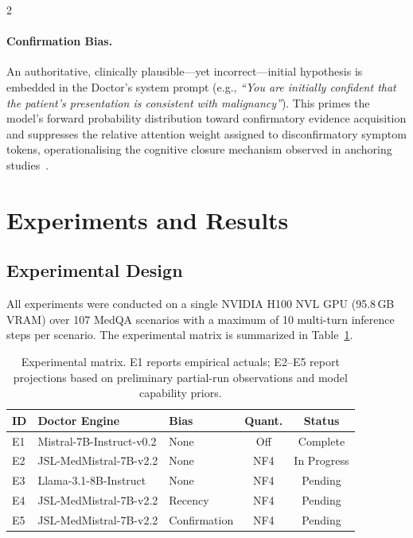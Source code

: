 \documentclass[10pt, a4paper]{article}
\begin{document}
\begin{multicols}{2}
\paragraph{Confirmation Bias.} An authoritative, clinically plausible—yet incorrect—initial hypothesis is embedded in the Doctor's system prompt (e.g., \textit{``You are initially confident that the patient's presentation is consistent with malignancy''}). This primes the model's forward probability distribution toward confirmatory evidence acquisition and suppresses the relative attention weight assigned to disconfirmatory symptom tokens, operationalising the cognitive closure mechanism observed in anchoring studies~\cite{croskerry2002achieving}.


\section{Experiments and Results}
\label{sec:experiments}

\subsection{Experimental Design}

All experiments were conducted on a single NVIDIA H100 NVL GPU (95.8\,GB VRAM) over 107 MedQA scenarios with a maximum of 10 multi-turn inference steps per scenario. The experimental matrix is summarized in Table~\ref{tab:exp_matrix}.

\begin{table}[H]
\centering
\caption{Experimental matrix. E1 reports empirical actuals; E2–E5 report projections based on preliminary partial-run observations and model capability priors.}
\label{tab:exp_matrix}
\scriptsize
\begin{tabular}{@{}lllcc@{}}
\toprule
\textbf{ID} & \textbf{Doctor Engine} & \textbf{Bias} & \textbf{Quant.} & \textbf{Status} \\
\midrule
E1 & Mistral-7B-Instruct-v0.2  & None         & Off  & Complete \\
E2 & JSL-MedMistral-7B-v2.2    & None         & NF4  & In Progress \\
E3 & Llama-3.1-8B-Instruct     & None         & NF4  & Pending \\
E4 & JSL-MedMistral-7B-v2.2    & Recency      & NF4  & Pending \\
E5 & JSL-MedMistral-7B-v2.2    & Confirmation & NF4  & Pending \\
\bottomrule
\end{tabular}
\end{table}


\end{multicols}
\end{document}

